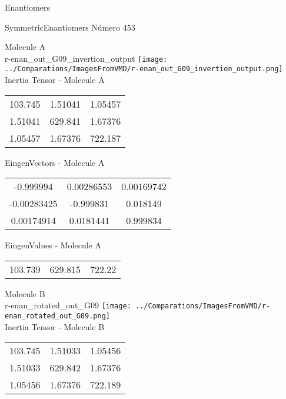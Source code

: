 \begin{center}
\vtab
\vtab
\textcolor{NavyBlue}{\Large Enantiomers}
\end{center}

 \newpage

\vtab[-2cm]
\begin{center}
{\large SymmetricEnantiomers \tab Número 453}
\end{center}
\begin{multicols}{2}
\begin{center}

Molecule A \\ 
r-enan\_out\_G09\_invertion\_output
\texttt{[image: ../Comparations/ImagesFromVMD/r-enan\_out\_G09\_invertion\_output.png]}
\\
Inertia Tensor - Molecule A \\
\vtab

\begin{tabular}{|c c c|}
103.745	 & 	1.51041	 & 	1.05457	 \\
1.51041	 & 	629.841	 & 	1.67376	 \\
1.05457	 & 	1.67376	 & 	722.187
\end{tabular}

\vtab
 EingenVectors - Molecule A     \\
\vtab
\begin{tabular}{|c c c|}
-0.999994	 & 	0.00286553	 & 	0.00169742	 \\
-0.00283425	 & 	-0.999831	 & 	0.018149	 \\
0.00174914	 & 	0.0181441	 & 	0.999834
\end{tabular}

\vtab
 EingenValues - Molecule A     \\
\vtab
\begin{tabular}{|c c c|}
103.739	 & 	629.815	 & 	722.22	 \\
\end{tabular}
\columnbreak

Molecule B \\ 
r-enan\_rotated\_out\_G09
\texttt{[image: ../Comparations/ImagesFromVMD/r-enan\_rotated\_out\_G09.png]}
\\
Inertia Tensor - Molecule B \\
\vtab

\begin{tabular}{|c c c|}
103.745	 & 	1.51033	 & 	1.05456	 \\
1.51033	 & 	629.842	 & 	1.67376	 \\
1.05456	 & 	1.67376	 & 	722.189
\end{tabular}


\end{center}
\end{multicols}
